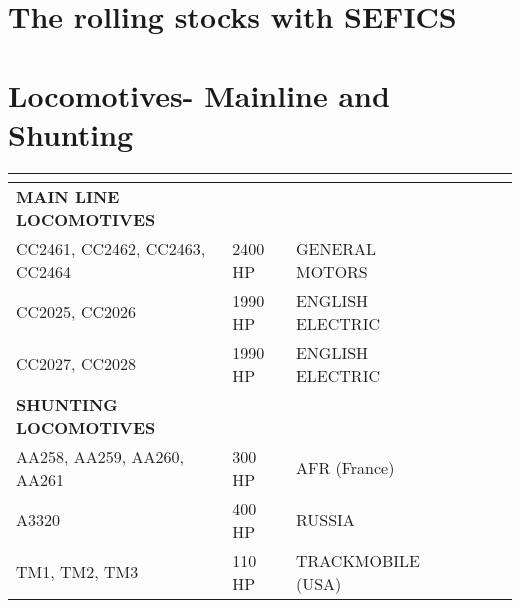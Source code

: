 \section{The rolling stocks with SEFICS}



\section{Locomotives- Mainline and Shunting}

\tablefirsthead{}
\tablehead{}
\tabletail{}
\tablelasttail{}
\begin{supertabular}{|m{6.432cm}|m{1.578cm}|m{3.9279997cm}|m{0.573cm}|m{0.86700004cm}|m{2.164cm}|}
\hline
{} &  &  &  &
\centering{}\\\hline
{\bfseries MAIN LINE LOCOMOTIVES} & {\color{black} ~} & {\bfseries ~} & \centering{\bfseries ~} &  & \raggedleft\arraybslash{\color{black} ~}\\\hline
{\color{black} CC2461, CC2462, CC2463, CC2464} & {\color{black} 2400 HP} & {\color{black} GENERAL MOTORS } &  & ~ & 
\raggedleft{}\\\hline
{\color{black} CC2025, CC2026} & {\color{black} 1990 HP} &{\color{black} ENGLISH ELECTRIC} & &~ &
\raggedleft{}\\\hline
{\color{black} CC2027, CC2028} &{\color{black} 1990 HP} &{\color{black} ENGLISH ELECTRIC} & &~ &
\raggedleft{}\\\hline
{\bfseries SHUNTING LOCOMOTIVES} &{\color{black} ~} &{\bfseries ~} &\centering{\bfseries ~} & &\raggedleft\arraybslash{\color{black} ~}\\\hline
{\color{black} AA258, AA259, AA260, AA261} &{\color{black} 300 HP} &{\color{black} AFR (France)} & &~ &
\raggedleft{}\\\hline
{\color{black} A3320} &{\color{black} 400 HP} &{\color{black} RUSSIA} & &~ &\raggedleft{}\\\hline
{\color{black} TM1, TM2, TM3} &
{\color{black} 110 HP} &
{\color{black} TRACKMOBILE (USA)} &
 & ~ &\raggedleft{}\\\hline

\end{supertabular}

